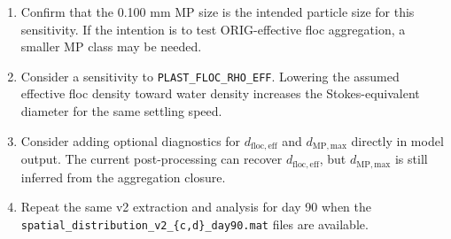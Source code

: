 \documentclass[11pt]{article}
\begin{document}
\begin{enumerate}
  \item Confirm that the 0.100 mm MP size is the intended particle size for
        this sensitivity.  If the intention is to test ORIG-effective floc
        aggregation, a smaller MP class may be needed.
  \item Consider a sensitivity to \texttt{PLAST\_FLOC\_RHO\_EFF}.  Lowering the
        assumed effective floc density toward water density increases the
        Stokes-equivalent diameter for the same settling speed.
  \item Consider adding optional diagnostics for
        $d_{\mathrm{floc,eff}}$ and $d_{\mathrm{MP,max}}$ directly in model
        output.  The current post-processing can recover
        $d_{\mathrm{floc,eff}}$, but $d_{\mathrm{MP,max}}$ is still inferred
        from the aggregation closure.
  \item Repeat the same v2 extraction and analysis for day 90 when the
        \texttt{spatial\_distribution\_v2\_\{c,d\}\_day90.mat} files are
        available.
\end{enumerate}
\end{document}
